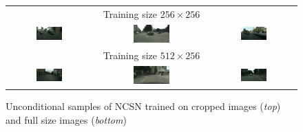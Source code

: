 \begin{figure}[] \label{fig:5.7}
    \centering
    \setlength\tabcolsep{-2pt}
    \begin{tabular}{ccc}
        & Training size $256\times256$ & \\
        \includegraphics[width=0.33\textwidth]{Chapters/figures/experiments/crop/1_sample.png} &
        \includegraphics[width=0.33\textwidth]{Chapters/figures/experiments/crop/5_sample.png} &
        \includegraphics[width=0.33\textwidth]{Chapters/figures/experiments/crop/8_sample.png}\\
        & Training size $512\times256$ & \\ 
        \includegraphics[width=0.33\textwidth]{Chapters/figures/experiments/crop/0_uncond_sample.png} &
        \includegraphics[width=0.33\textwidth]{Chapters/figures/experiments/crop/3_uncond_sample.png} &
        \includegraphics[width=0.33\textwidth]{Chapters/figures/experiments/crop/7_uncond_sample.png}
    \end{tabular}
    \caption[Unconditional samples of NCSN trained on cropped images and full size images]{Unconditional samples of NCSN trained on cropped images (\textit{top}) and full size images (\textit{bottom})}
\end{figure}

